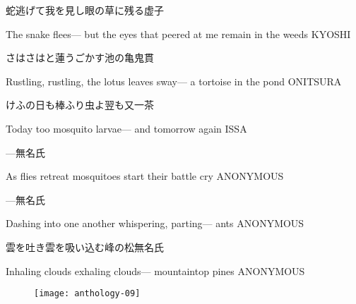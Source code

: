 \begin{haiku}
    {\FH 蛇逃げて我を見し眼の草に残る}\hfill{\FH 虚子}

    \vin{} The snake flees---
    \vin{} \vin{} but the eyes that peered at me
    \vin{} \vin{} \vin{} remain in the weeds \hspace{\fill} KYOSHI
\end{haiku}

\begin{haiku}
    {\FH さはさはと蓮うごかす池の亀}\hfill{\FH 鬼貫}

    \vin{} Rustling, rustling,
    \vin{} \vin{} the lotus leaves sway---
    \vin{} \vin{} \vin{} a tortoise in the pond \hspace{\fill} ONITSURA
\end{haiku}

\begin{haiku}
    {\FH けふの日も棒ふり虫よ翌も又}\hfill{\FH 一茶}

    \vin{} Today too
    \vin{} \vin{} mosquito larvae---
    \vin{} \vin{} \vin{} and tomorrow again \hspace{\fill} ISSA
\end{haiku}

\begin{haiku}
    {---}\hfill{\FH 無名氏}

    \vin{} As flies retreat
    \vin{} \vin{} mosquitoes start
    \vin{} \vin{} \vin{} their battle cry \hspace{\fill} ANONYMOUS
\end{haiku}

\begin{haiku}
    {---}\hfill{\FH 無名氏}

    \vin{} Dashing into one another
    \vin{} \vin{} whispering, parting---
    \vin{} \vin{} \vin{} ants \hspace{\fill} ANONYMOUS
\end{haiku}

\begin{haiku}
    {雲を吐き雲を吸い込む峰の松}\hfill{\FH 無名氏}

    \vin{} Inhaling clouds
    \vin{} \vin{} exhaling clouds---
    \vin{} \vin{} \vin{} mountaintop pines \hspace{\fill} ANONYMOUS
\end{haiku}

\begin{figure}
    \texttt{[image: anthology-09]}
\end{figure}

